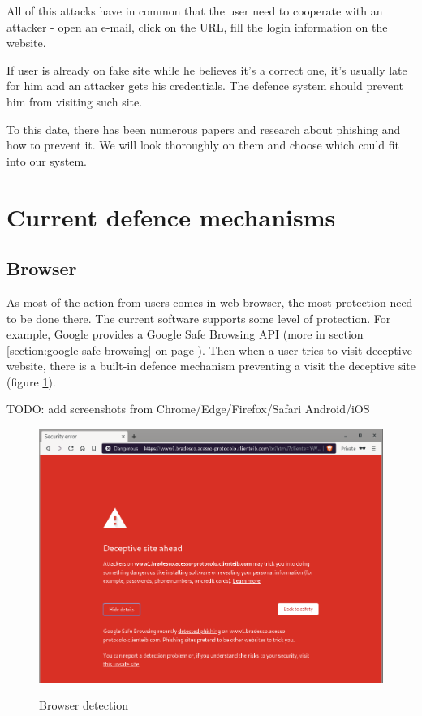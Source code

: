 \documentclass[
  digital, %
  oneside, %
  table,   %
  nolof,     %
  nolot,     %
]{fithesis3}
\begin{document}
All of this attacks have in common that the user need to  cooperate with an attacker - open an e-mail, click on the URL, fill the login information on the website.

If user is already on fake site while he believes it's a correct one, it's usually late for him and an attacker gets his credentials. The defence system should prevent him from visiting such site. 

To this date, there has been numerous papers and research about phishing and how to prevent it. We will look thoroughly on them and choose which could fit into our system.

\section{Current defence mechanisms}

\subsection{Browser}

As most of the action \cite{citacia dacoho} from users comes in web browser, the most protection need to be done there. The current software supports some level of protection. For example, Google provides a Google Safe Browsing API (more in section \ref{section:google-safe-browsing} on page \pageref{section:google-safe-browsing}). Then when a user tries to visit deceptive website, there is a built-in defence mechanism preventing a visit the deceptive site (figure \ref{fig:browse-detection}).

TODO: add screenshots from Chrome/Edge/Firefox/Safari Android/iOS

\begin{figure}[h!]
  \caption{Browser detection}
  \centering
  \includegraphics[width=1\textwidth]{images/browser_phishing_detected.png}
  \label{fig:browse-detection}
\end{figure}
\end{document}
